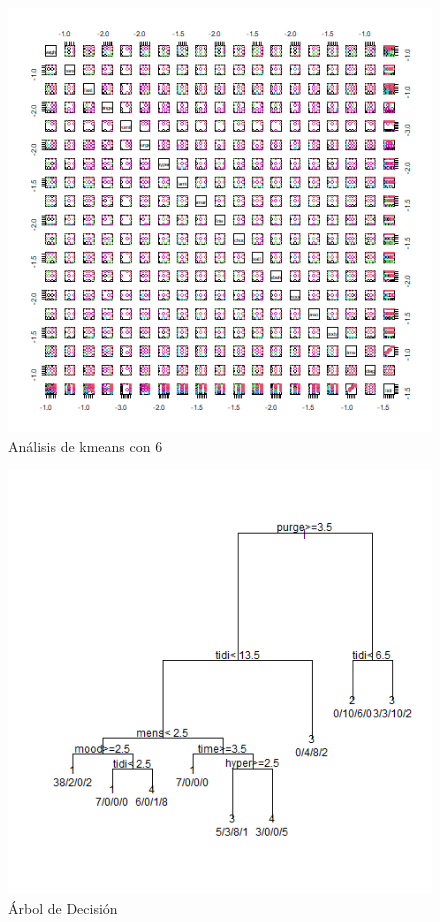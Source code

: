 \documentclass[a4paper,10pt,twocolumn]{article}
\begin{document}
\begin{figure}[htb]%
	\begin{center}
		\includegraphics[width=\linewidth]{kmeans_cluster_6}
	\end{center}
	\caption{Análisis de kmeans con 6 \label{fig:kmeans_cluster_6}}%
\end{figure}

\begin{figure}[htb]%
	\begin{center}
		\includegraphics[width=\linewidth]{d_tree_cluster_diag_class_8}
	\end{center}
	\caption{Árbol de Decisión \label{fig:d_tree_cluster_diag_class_8}}%
\end{figure}


\label{end}
\end{document}
